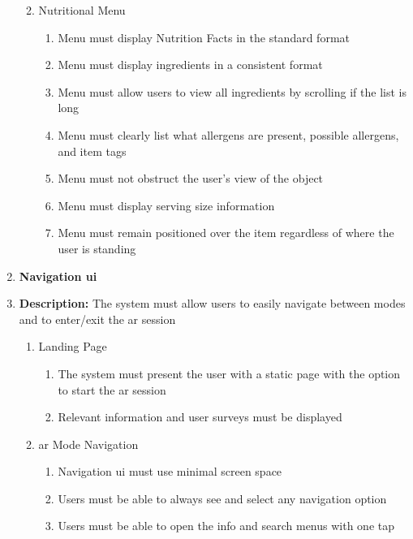 \documentclass[thesis]{fputhesis}
\begin{document}
\begin{body}
\begin{enumerate}
\begin{enumerate}
\begin{enumerate}
        \end{enumerate}
        \item[\textbullet] Nutritional Menu
        \begin{enumerate}
            \item[\textbullet] Menu must display Nutrition Facts in the standard format
            \item[\textbullet] Menu must display ingredients in a consistent format
            \item[\textbullet] Menu must allow users to view all ingredients by scrolling if the list is long
            \item[\textbullet] Menu must clearly list what allergens are present, possible allergens, and item tags
            \item[\textbullet] Menu must not obstruct the user's view of the object
            \item[\textbullet] Menu must display serving size information
            \item[\textbullet] Menu must remain positioned over the item regardless of where the user is standing
        \end{enumerate}
    \end{enumerate}
    \item \textbf{Navigation \acrshort{ui}}
    \item[] \textbf{Description:} The system must allow users to easily navigate between modes and to enter/exit the \acrshort{ar} session
    \begin{enumerate}
        \item[\textbullet] Landing Page
        \begin{enumerate}
            \item[\textbullet] The system must present the user with a static page with the option to start the \acrshort{ar} session
            \item[\textbullet] Relevant information and user surveys must be displayed
        \end{enumerate}
        \item[\textbullet] \acrshort{ar} Mode Navigation
        \begin{enumerate}
            \item[\textbullet] Navigation \acrshort{ui} must use minimal screen space
            \item[\textbullet] Users must be able to always see and select any navigation option
            \item[\textbullet] Users must be able to open the info and search menus with one tap

\end{enumerate}
\end{enumerate}
\end{enumerate}
\end{body}
\end{document}
